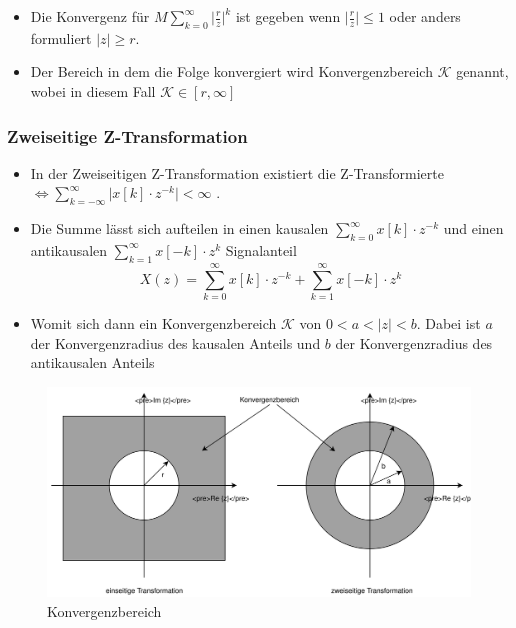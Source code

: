 \documentclass[11pt]{article}
\makeatletter
\def\maxwidth{\ifdim\Gin@nat@width>\linewidth\linewidth
    \else\Gin@nat@width\fi}
\let\Oldincludegraphics\includegraphics
\renewcommand{\includegraphics}[1]{\Oldincludegraphics[width=.8\maxwidth]{#1}}
\providecommand{\tightlist}{%
      \setlength{\itemsep}{0pt}\setlength{\parskip}{0pt}}
\def\lt{<}
\makeatother
\begin{document}
    \begin{itemize}
\tightlist
\item
  Die Konvergenz für \(M \sum_{k=0}^\infty \big|\frac {r} {z}\big|^k\)
  ist gegeben wenn \(\big| \frac{r}{z} \big| \leq 1\) oder anders
  formuliert \(| z | \geq r\).
\end{itemize}

    \begin{itemize}
\tightlist
\item
  Der Bereich in dem die Folge konvergiert wird Konvergenzbereich
  \(\mathcal{K}\) genannt, wobei in diesem Fall
  \(\mathcal{K} \in [r,\infty]\)
\end{itemize}

    \subsubsection{Zweiseitige
Z-Transformation}\label{zweiseitige-z-transformation}

\begin{itemize}
\tightlist
\item
  In der Zweiseitigen Z-Transformation existiert die Z-Transformierte
  \(\iff \sum_{k=-\infty}^\infty \big|x[k]\cdot z^{-k}\big| \lt \infty\)
  .
\end{itemize}

    \begin{itemize}
\tightlist
\item
  Die Summe lässt sich aufteilen in einen kausalen
  \(\sum_{k=0}^\infty x[k]\cdot z^{-k}\) und einen antikausalen
  \(\sum_{k=1}^\infty x[-k]\cdot z^{k}\) Signalanteil
  \[X(z) = \sum_{k=0}^\infty x[k]\cdot z^{-k} +  \sum_{k=1}^\infty x[-k]\cdot z^{k} \]
\end{itemize}

    \begin{itemize}
\tightlist
\item
  Womit sich dann ein Konvergenzbereich \(\mathcal{K}\) von
  \(0 \lt a \lt |z| \lt b\). Dabei ist \(a\) der Konvergenzradius des
  kausalen Anteils und \(b\) der Konvergenzradius des antikausalen
  Anteils
\end{itemize}

    \begin{figure}
\centering
\includegraphics{Konvergenzbereich.svg}
\caption{Konvergenzbereich}
\end{figure}
\end{document}
